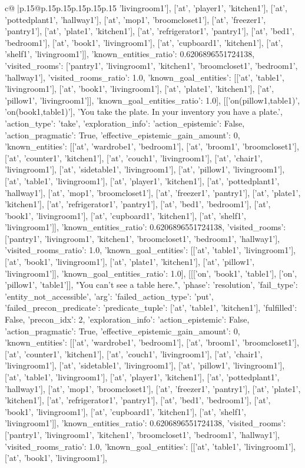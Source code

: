 \documentclass{article}
\begin{document}
{\begin{supertabular}{c@{$\;$}|p{.15\linewidth}@{}p{.15\linewidth}p{.15\linewidth}p{.15\linewidth}p{.15\linewidth}p{.15\linewidth}}
{{{'livingroom1'], ['at', 'player1', 'kitchen1'], ['at', 'pottedplant1', 'hallway1'], ['at', 'mop1', 'broomcloset1'], ['at', 'freezer1', 'pantry1'], ['at', 'plate1', 'kitchen1'], ['at', 'refrigerator1', 'pantry1'], ['at', 'bed1', 'bedroom1'], ['at', 'book1', 'livingroom1'], ['at', 'cupboard1', 'kitchen1'], ['at', 'shelf1', 'livingroom1']], 'known_entities_ratio': 0.6206896551724138, 'visited_rooms': ['pantry1', 'livingroom1', 'kitchen1', 'broomcloset1', 'bedroom1', 'hallway1'], 'visited_rooms_ratio': 1.0, 'known_goal_entities': [['at', 'table1', 'livingroom1'], ['at', 'book1', 'livingroom1'], ['at', 'plate1', 'kitchen1'], ['at', 'pillow1', 'livingroom1']], 'known_goal_entities_ratio': 1.0}}], [['on(pillow1,table1)', 'on(book1,table1)'], 'You take the plate. In your inventory you have a plate.', {'action_type': 'take', 'exploration_info': {'action_epistemic': False, 'action_pragmatic': True, 'effective_epistemic_gain_amount': 0, 'known_entities': [['at', 'wardrobe1', 'bedroom1'], ['at', 'broom1', 'broomcloset1'], ['at', 'counter1', 'kitchen1'], ['at', 'couch1', 'livingroom1'], ['at', 'chair1', 'livingroom1'], ['at', 'sidetable1', 'livingroom1'], ['at', 'pillow1', 'livingroom1'], ['at', 'table1', 'livingroom1'], ['at', 'player1', 'kitchen1'], ['at', 'pottedplant1', 'hallway1'], ['at', 'mop1', 'broomcloset1'], ['at', 'freezer1', 'pantry1'], ['at', 'plate1', 'kitchen1'], ['at', 'refrigerator1', 'pantry1'], ['at', 'bed1', 'bedroom1'], ['at', 'book1', 'livingroom1'], ['at', 'cupboard1', 'kitchen1'], ['at', 'shelf1', 'livingroom1']], 'known_entities_ratio': 0.6206896551724138, 'visited_rooms': ['pantry1', 'livingroom1', 'kitchen1', 'broomcloset1', 'bedroom1', 'hallway1'], 'visited_rooms_ratio': 1.0, 'known_goal_entities': [['at', 'table1', 'livingroom1'], ['at', 'book1', 'livingroom1'], ['at', 'plate1', 'kitchen1'], ['at', 'pillow1', 'livingroom1']], 'known_goal_entities_ratio': 1.0}}], [[['on', 'book1', 'table1'], ['on', 'pillow1', 'table1']], "You can't see a table here.", {'phase': 'resolution', 'fail_type': 'entity_not_accessible', 'arg': {'failed_action_type': 'put', 'failed_precon_predicate': {'predicate_tuple': ['at', 'table1', 'kitchen1'], 'fulfilled': False, 'precon_idx': 2}}, 'exploration_info': {'action_epistemic': False, 'action_pragmatic': True, 'effective_epistemic_gain_amount': 0, 'known_entities': [['at', 'wardrobe1', 'bedroom1'], ['at', 'broom1', 'broomcloset1'], ['at', 'counter1', 'kitchen1'], ['at', 'couch1', 'livingroom1'], ['at', 'chair1', 'livingroom1'], ['at', 'sidetable1', 'livingroom1'], ['at', 'pillow1', 'livingroom1'], ['at', 'table1', 'livingroom1'], ['at', 'player1', 'kitchen1'], ['at', 'pottedplant1', 'hallway1'], ['at', 'mop1', 'broomcloset1'], ['at', 'freezer1', 'pantry1'], ['at', 'plate1', 'kitchen1'], ['at', 'refrigerator1', 'pantry1'], ['at', 'bed1', 'bedroom1'], ['at', 'book1', 'livingroom1'], ['at', 'cupboard1', 'kitchen1'], ['at', 'shelf1', 'livingroom1']], 'known_entities_ratio': 0.6206896551724138, 'visited_rooms': ['pantry1', 'livingroom1', 'kitchen1', 'broomcloset1', 'bedroom1', 'hallway1'], 'visited_rooms_ratio': 1.0, 'known_goal_entities': [['at', 'table1', 'livingroom1'], ['at', 'book1', 'livingroom1'], }}}
\end{supertabular}}
\end{document}
